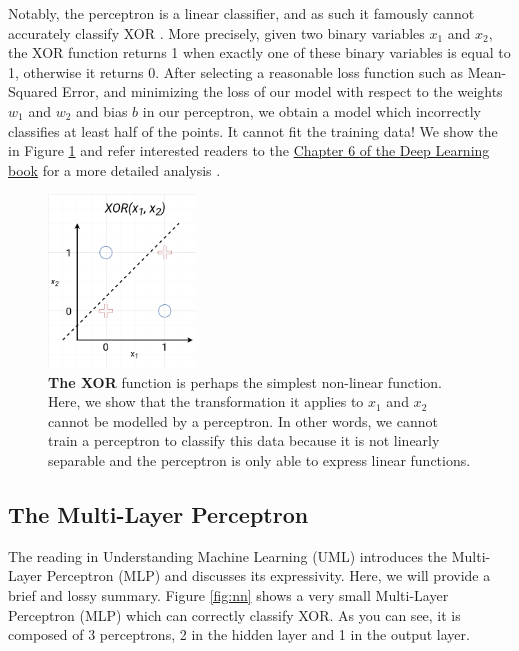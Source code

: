 \documentclass{article}
\begin{document}
\vspace{5mm} %

Notably, the perceptron is a linear classifier, and as such it famously cannot accurately classify XOR \cite{Minskyetal1969}. More precisely, given two binary variables $x_1$ and $x_2$, the XOR function returns 1 when exactly one of these binary variables is equal to 1, otherwise it returns 0. After selecting a reasonable loss function such as Mean-Squared Error, and minimizing the loss of our model with respect to the weights $w_1$ and $w_2$ and bias $b$ in our perceptron, we obtain a model which incorrectly classifies at least half of the points. It cannot fit the training data! We show the in Figure \ref{fig:XOR} and refer interested readers to the \href{https://www.deeplearningbook.org/contents/mlp.html}{Chapter 6 of the Deep Learning book} for a more detailed analysis \citep{Goodfellow-et-al-2016}.\\

\begin{figure}[H]
    \centering
    \includegraphics[width=0.35\textwidth]{figures/xor_non_linsep.png}
    \caption{\textbf{The XOR} function is perhaps the simplest non-linear function. Here, we show that the transformation it applies to $x_1$ and $x_2$ cannot be modelled by a perceptron. In other words, we cannot train a perceptron to classify this data because it is not linearly separable and the perceptron is only able to express linear functions.}
    \label{fig:XOR}
\end{figure}

\subsection{The Multi-Layer Perceptron}
\label{subsec:mlp}
The reading in Understanding Machine Learning (UML) \citep{Shalev-Shwartz:2014:UML:2621980} introduces the Multi-Layer Perceptron (MLP) and discusses its expressivity. Here, we will provide a brief and lossy summary. Figure \ref{fig:nn} shows a very small Multi-Layer Perceptron (MLP) which can correctly classify XOR. As you can see, it is composed of 3 perceptrons, 2 in the hidden layer and 1 in the output layer.
\end{document}
